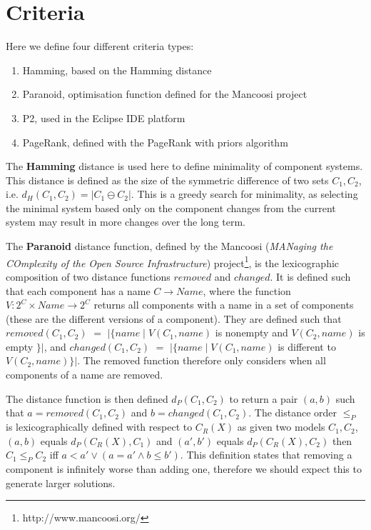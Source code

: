 \section{Criteria}
Here we define four different criteria types:
\begin{enumerate}
  \item Hamming, based on the Hamming distance
  \item Paranoid, optimisation function defined for the Mancoosi project
  \item P2, used in the Eclipse IDE platform
  \item PageRank, defined with the PageRank with priors algorithm
\end{enumerate}

The \textbf{Hamming} distance \cite{hamming1950error} is used here to define minimality of component systems.
This distance is defined as the size of the symmetric difference of two sets $C_1,C_2$, 
i.e. $d_H(C_1,C_2) = |C_1 \ominus C_2|$.
This is a greedy search for minimality, 
as selecting the minimal system based only on the component changes from the current system may result in more changes over the long term.

The \textbf{Paranoid} distance function, 
defined by the Mancoosi (\textit{MANaging the COmplexity of the Open Source Infrastructure}) project\footnote{http://www.mancoosi.org/}, 
is the lexicographic composition of two distance functions $removed$ and $changed$.
It is defined such that each component has a name $C \rightarrow Name$,
where the function $V: 2^C \times Name \rightarrow 2^C$ returns all components with a name in a set of components 
(these are the different versions of a component).
They are defined such that $removed(C_1,C_2)$ $=$ $|\{name \mid V(C_1,name) $ is nonempty and $V(C_2,name)$ is empty $\}|$,
and $changed(C_1,C_2)$ $=$ $|\{name \mid V(C_1,name)$ is different to $V(C_2,name)\}|$.
The removed function therefore only considers when all components of a name are removed. 

The distance function is then defined $d_P(C_1,C_2)$ to return a pair $(a,b)$ such that $a = removed(C_1,C_2)$ and $b = changed(C_1,C_2)$.
The distance order $\leq_{P}$ is lexicographically defined with respect to $C_R(X)$ as given two models $C_1,C_2$,
$(a,b)$ equals $d_P(C_R(X),C_1)$ and $(a',b')$ equals $d_P(C_R(X),C_2)$ then
$C_1 \leq_{P} C_2 $ iff $a < a' \vee (a = a' \wedge b \leq b')$.
This definition states that removing a component is infinitely worse than adding one, 
therefore we should expect this to generate larger solutions.

